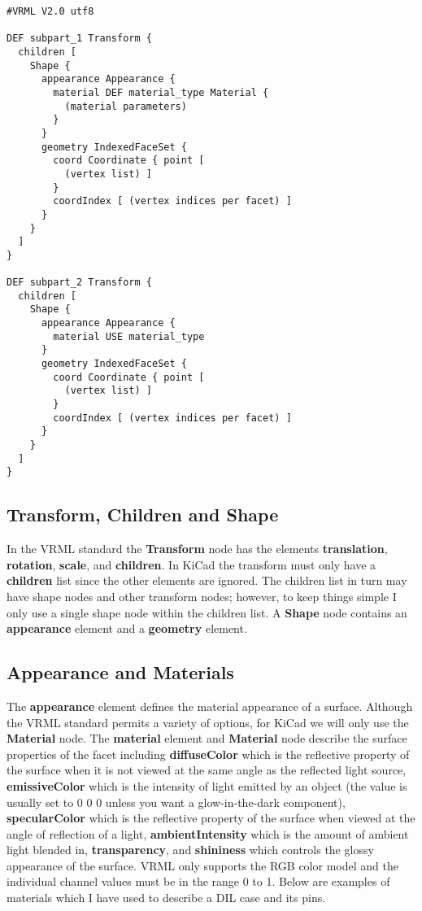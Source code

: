 \documentclass[a4paper, dvipdfm]{article}
\begin{document}
\begin{verbatim}
#VRML V2.0 utf8

DEF subpart_1 Transform {
  children [
    Shape {
      appearance Appearance {
        material DEF material_type Material {
          (material parameters)
        }
      }
      geometry IndexedFaceSet {
        coord Coordinate { point [
          (vertex list) ]
        }
        coordIndex [ (vertex indices per facet) ]
      }
    }
  ]
}

DEF subpart_2 Transform {
  children [
    Shape {
      appearance Appearance {
        material USE material_type
      }
      geometry IndexedFaceSet {
        coord Coordinate { point [
          (vertex list) ]
        }
        coordIndex [ (vertex indices per facet) ]
      }
    }
  ]
}
\end{verbatim}

\subsection{Transform, Children and Shape}
In the VRML standard the \textbf{Transform} node has the elements \textbf{translation},
\textbf{rotation}, \textbf{scale}, and \textbf{children}. In KiCad the transform must only
have a \textbf{children} list since the other elements are ignored.
The children list in turn may have shape nodes and other
transform nodes; however, to keep things simple I only use a single shape node within
the children list. A \textbf{Shape} node contains an \textbf{appearance} element and a
\textbf{geometry} element.

\subsection{Appearance and Materials}
The \textbf{appearance} element defines the material appearance of a surface. Although the VRML
standard permits a variety of options, for KiCad we will only use the \textbf{Material} node.
The \textbf{material} element and \textbf{Material} node describe the surface properties of
the facet including \textbf{diffuseColor} which is the reflective property of the surface when it is
not viewed at the same angle as the reflected light source, \textbf{emissiveColor} which is the
intensity of light emitted by an object (the value is usually set to 0 0 0 unless you want
a glow-in-the-dark component), \textbf{specularColor} which is the reflective property of the
surface when viewed at the angle of reflection of a light, \textbf{ambientIntensity} which is the
amount of ambient light blended in, \textbf{transparency}, and \textbf{shininess} which
controls the glossy appearance of the surface. VRML only supports the RGB color model and the
individual channel values must be in the range 0 to 1. Below are examples of materials which I have used
to describe a DIL case and its pins.
\end{document}
